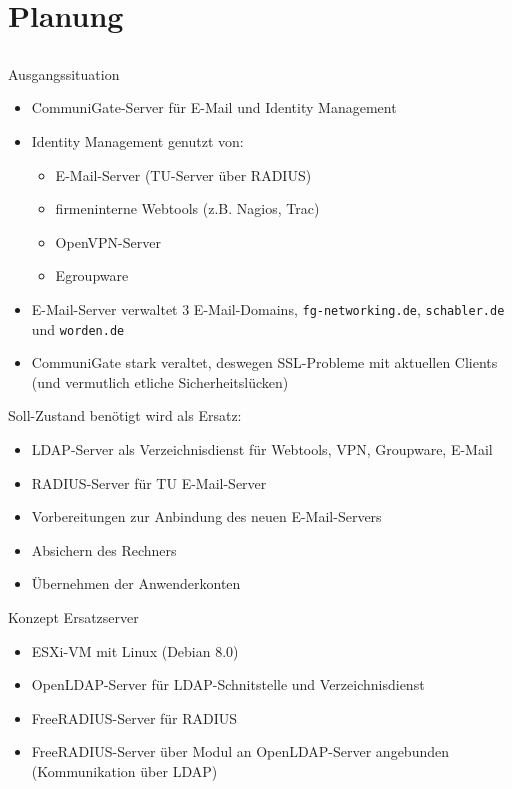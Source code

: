 \documentclass[handout,svgnames]{beamer}
\begin{document}
\section{Planung}
\subsection{}
\begin{frame}{Ausgangssituation}
\begin{itemize}
	\item CommuniGate-Server für E-Mail und Identity Management
	\item Identity Management genutzt von:
	\begin{itemize}
		\item E-Mail-Server (TU-Server über RADIUS)
		\item firmeninterne Webtools (z.B. Nagios, Trac)
		\item OpenVPN-Server
		\item Egroupware
	\end{itemize}
	\item E-Mail-Server verwaltet 3 E-Mail-Domains, \texttt{fg-networking.de}, \texttt{schabler.de} und \texttt{worden.de}
 	\item CommuniGate stark veraltet, deswegen SSL-Probleme mit aktuellen Clients (und vermutlich etliche Sicherheitslücken)
\end{itemize}
\end{frame}

\begin{frame}{Soll-Zustand}
benötigt wird als Ersatz:
\begin{itemize}
	\item LDAP-Server als Verzeichnisdienst für Webtools, VPN, Groupware, E-Mail
	\item RADIUS-Server für TU E-Mail-Server
	\item Vorbereitungen zur Anbindung des neuen E-Mail-Servers
	\item Absichern des Rechners
	\item Übernehmen der Anwenderkonten
\end{itemize}
\end{frame}


\begin{frame}{Konzept Ersatzserver}
\begin{itemize}
	\item ESXi-VM mit Linux (Debian 8.0)
	\item OpenLDAP-Server für LDAP-Schnitstelle und Verzeichnisdienst
	\item FreeRADIUS-Server für RADIUS
	\item FreeRADIUS-Server über Modul an OpenLDAP-Server angebunden (Kommunikation über LDAP)
\end{itemize}
\end{frame}
\end{document}
